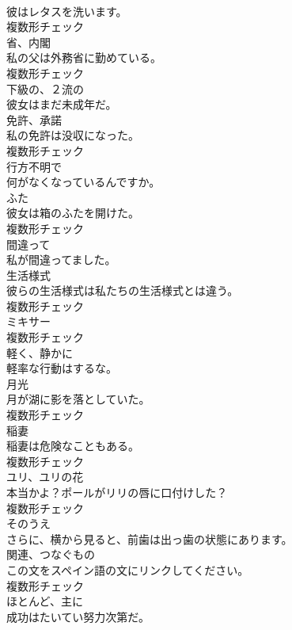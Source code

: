 \documentclass[8pt]{extreport}
\begin{document}
\begin{CJK}{UTF8}{min}
\\	彼はレタスを洗います。	
\\	複数形チェック
\\	[名詞]	省、内閣	
\\	私の父は外務省に勤めている。	
\\	複数形チェック
\\	[形容詞]	下級の、２流の	
\\	彼女はまだ未成年だ。	
\\	[名詞]	免許、承諾	
\\	私の免許は没収になった。	
\\	複数形チェック
\\	[形容詞]	行方不明で	
\\	何がなくなっているんですか。	
\\	[名詞]	ふた	
\\	彼女は箱のふたを開けた。	
\\	複数形チェック
\\	[形容詞]	間違って	
\\	私が間違ってました。	
\\	[名詞]	生活様式	
\\	彼らの生活様式は私たちの生活様式とは違う。	
\\	複数形チェック
\\	[名詞]	ミキサー	
\\	複数形チェック
\\	[副詞]	軽く、静かに	
\\	軽率な行動はするな。	
\\	[名詞]	月光	
\\	月が湖に影を落としていた。	
\\	複数形チェック
\\	[名詞]	稲妻	
\\	稲妻は危険なこともある。	
\\	複数形チェック
\\	[名詞]	ユリ、ユリの花	
\\	本当かよ？ポールがリリの唇に口付けした？	
\\	複数形チェック
\\	[副詞]	そのうえ	
\\	さらに、横から見ると、前歯は出っ歯の状態にあります。	
\\	[名詞]	関連、つなぐもの	
\\	この文をスペイン語の文にリンクしてください。	
\\	複数形チェック
\\	[副詞]	ほとんど、主に	
\\	成功はたいてい努力次第だ。	

\end{CJK}
\end{document}
